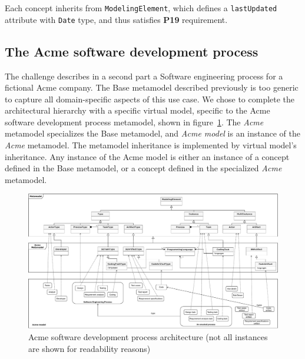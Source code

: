 Each concept inherits from \texttt{ModelingElement}, which defines a \texttt{lastUpdated} attribute with \texttt{Date} type, and thus satisfies \textbf{P19} requirement.

\subsection{The Acme software development process}
\label{sec:AcmeSoftwareDevelopmentProcess}

The challenge describes in a second part a Software engineering process for a fictional Acme company. The Base metamodel described previously is too generic to capture all domain-specific aspects of this use case. We chose to complete the architectural hierarchy with a specific virtual model, specific to the Acme software development process metamodel, shown in figure~\ref{fig:AcmeFullArchitecture}.
The \textit{Acme} metamodel specializes the Base metamodel, and \textit{Acme model} is an instance of the \textit{Acme} metamodel. The metamodel inheritance is implemented by virtual model's inheritance. Any instance of the Acme model is either an instance of a concept defined in the Base metamodel, or a concept defined in the specialized \textit{Acme} metamodel.


\begin{figure}
 \centering
     \includegraphics[width=1.0 \textwidth]{Figures/AcmeFullArchitecture.pdf}
     \caption{Acme software development process architecture (not all instances are shown for readability reasons)}
    \label{fig:AcmeFullArchitecture}
\end{figure}

